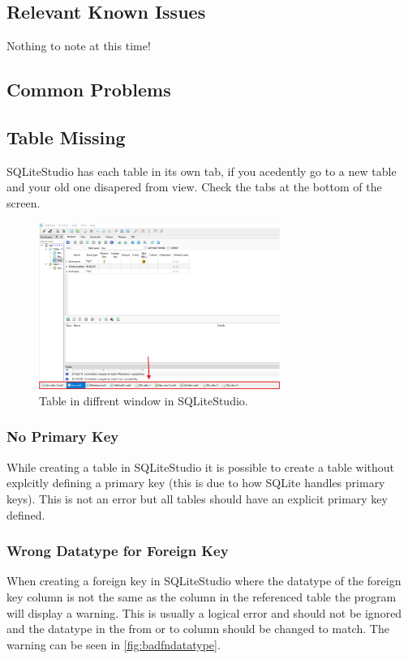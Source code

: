 \documentclass[a4paper,11pt,oneside]{article}
\begin{document}
\begin{sloppypar}
\subsection{Relevant Known Issues}
\label{sqliteStudioKnownIssues}
Nothing to note at this time!

\subsection{Common Problems}
\label{sqliteStudioCommonProblems}

\subsection {Table Missing}
\label{sqliteStudioTableDisapered}
SQLiteStudio has each table in its own tab, if you acedently go to a new table and your old one disapered from view. Check the tabs at the bottom of the screen.
\begin{figure}[!htb]
  \centering
  \includegraphics[width=0.7\textwidth]{sqlitestudio/common_problems/table_disapered.png}
  \caption{Table in diffrent window in SQLiteStudio.}
  \label{fig:tabledisapered}
\end{figure}


\subsubsection{No Primary Key}
\label{sqliteStudioNoPrimaryKey}
While creating a table in SQLiteStudio it is possible to create a table without explcitly defining a primary key (this is due to how SQLite handles primary keys). This is not an error but all tables should have an explicit primary key defined.


\subsubsection{Wrong Datatype for Foreign Key}
\label{sqliteStudioWrongDatatypeForeignKey}
When creating a foreign key in SQLiteStudio where the datatype of the foreign key column is not the same as the column in the referenced table the program will display a warning. This is usually a logical error and should not be ignored and the datatype in the from or to column should be changed to match. The warning can be seen in \autoref{fig:badfndatatype}.



\end{sloppypar}
\end{document}
